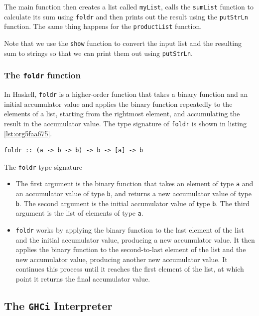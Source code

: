 \documentclass[a4paper, titlepage, twoside]{article}
\begin{document}
The main function then creates a list called \texttt{myList}, calls the \texttt{sumList} function to calculate its sum using \texttt{foldr} and then prints out the result using the \texttt{putStrLn} function. The same thing happens for the \texttt{productList} function.

Note that we use the \texttt{show} function to convert the input list and the resulting sum to strings so that we can print them out using \texttt{putStrLn}.

\subsubsection{The \texttt{foldr} function}
\label{sec:org17ee016}

In Haskell, \texttt{foldr} is a higher-order function that takes a binary function and an initial accumulator value and applies the binary function repeatedly to the elements of a list, starting from the rightmost element, and accumulating the result in the accumulator value. The type signature of \texttt{foldr} is shown in listing \ref{lst:org5faa675}.

\begin{listing}[htbp]
\begin{verbatim}
foldr :: (a -> b -> b) -> b -> [a] -> b
\end{verbatim}
\caption{\label{lst:org5faa675}The \texttt{foldr} type signature}
\end{listing}

\begin{itemize}
\item The first argument is the binary function that takes an element of type \texttt{a} and an accumulator value of type \texttt{b}, and returns a new accumulator value of type \texttt{b}. The second argument is the initial accumulator value of type \texttt{b}. The third argument is the list of elements of type \texttt{a}.

\item \texttt{foldr} works by applying the binary function to the last element of the list and the initial accumulator value, producing a new accumulator value. It then applies the binary function to the second-to-last element of the list and the new accumulator value, producing another new accumulator value. It continues this process until it reaches the first element of the list, at which point it returns the final accumulator value.
\end{itemize}

\subsection{The \texttt{GHCi} Interpreter}
\label{sec:orga5abee1}
\end{document}
